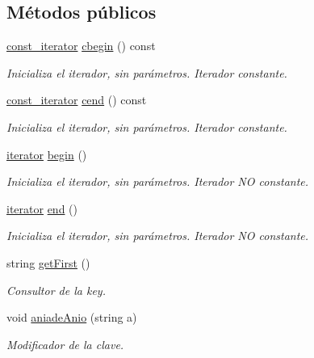 \subsection*{Métodos públicos}
\begin{DoxyCompactItemize}
\item 
\hyperlink{classEventoHistorico_1_1const__iterator}{const\+\_\+iterator} \hyperlink{classEventoHistorico_a78a3ad0944311039c814e0b212e68929}{cbegin} () const
\begin{DoxyCompactList}\small\item\em Inicializa el iterador, sin parámetros. Iterador constante. \end{DoxyCompactList}\item 
\hyperlink{classEventoHistorico_1_1const__iterator}{const\+\_\+iterator} \hyperlink{classEventoHistorico_ab217a30a72652cabb431d7b50c9904e9}{cend} () const
\begin{DoxyCompactList}\small\item\em Inicializa el iterador, sin parámetros. Iterador constante. \end{DoxyCompactList}\item 
\hyperlink{classEventoHistorico_1_1iterator}{iterator} \hyperlink{classEventoHistorico_a8f27947006df390ef03eab962029e14b}{begin} ()
\begin{DoxyCompactList}\small\item\em Inicializa el iterador, sin parámetros. Iterador NO constante. \end{DoxyCompactList}\item 
\hyperlink{classEventoHistorico_1_1iterator}{iterator} \hyperlink{classEventoHistorico_ac0c4b9959e20bc695d6d14c85ffa058e}{end} ()
\begin{DoxyCompactList}\small\item\em Inicializa el iterador, sin parámetros. Iterador NO constante. \end{DoxyCompactList}\item 
string \hyperlink{classEventoHistorico_a6fc58df8314cce74171cc0ae5ab99065}{get\+First} ()
\begin{DoxyCompactList}\small\item\em Consultor de la key. \end{DoxyCompactList}\item 
void \hyperlink{classEventoHistorico_ad7bb99f4afa1b283f965a5ed378a5c14}{aniade\+Anio} (string a)
\begin{DoxyCompactList}\small\item\em Modificador de la clave. \end{DoxyCompactList}\item 

\end{DoxyCompactItemize}
